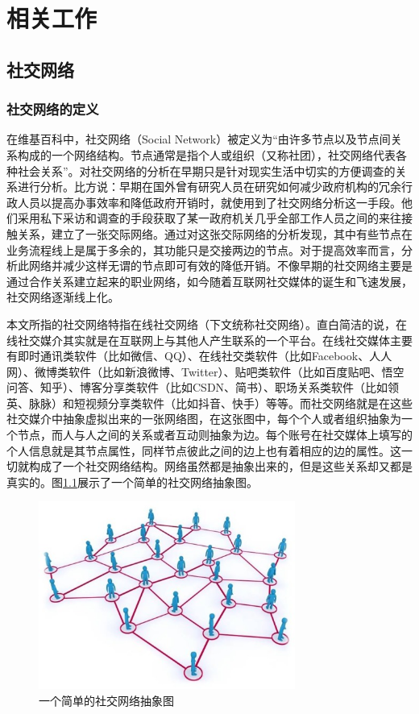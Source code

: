 \chapter{相关工作}
\section{社交网络}
\subsection{社交网络的定义}
在维基百科中，社交网络（Social Network）被定义为“由许多节点以及节点间关系构成的一个网络结构。节点通常是指个人或组织（又称社团），社交网络代表各种社会关系”。对社交网络的分析在早期只是针对现实生活中切实的方便调查的关系进行分析。比方说：早期在国外曾有研究人员在研究如何减少政府机构的冗余行政人员以提高办事效率和降低政府开销时，就使用到了社交网络分析这一手段。他们采用私下采访和调查的手段获取了某一政府机关几乎全部工作人员之间的来往接触关系，建立了一张交际网络。通过对这张交际网络的分析发现，其中有些节点在业务流程线上是属于多余的，其功能只是交接两边的节点。对于提高效率而言，分析此网络并减少这样无谓的节点即可有效的降低开销。不像早期的社交网络主要是通过合作关系建立起来的职业网络，如今随着互联网社交媒体的诞生和飞速发展，社交网络逐渐线上化。

本文所指的社交网络特指在线社交网络（下文统称社交网络）。直白简洁的说，在线社交媒介其实就是在互联网上与其他人产生联系的一个平台。在线社交媒体主要有即时通讯类软件（比如微信、QQ）、在线社交类软件（比如Facebook、人人网）、微博类软件（比如新浪微博、Twitter）、贴吧类软件（比如百度贴吧、悟空问答、知乎）、博客分享类软件（比如CSDN、简书）、职场关系类软件（比如领英、脉脉）和短视频分享类软件（比如抖音、快手）等等。而社交网络就是在这些社交媒介中抽象虚拟出来的一张网络图，在这张图中，每个个人或者组织抽象为一个节点，而人与人之间的关系或者互动则抽象为边。每个账号在社交媒体上填写的个人信息就是其节点属性，同样节点彼此之间的边上也有着相应的边的属性。这一切就构成了一个社交网络结构。网络虽然都是抽象出来的，但是这些关系却又都是真实的。图\ref{fig:fig2-0}展示了一个简单的社交网络抽象图。

\begin{figure}
  \centering
  \includegraphics[width=0.75\textwidth]{figures/fig2-0}
  \caption{一个简单的社交网络抽象图}\label{fig:fig2-0}
\end{figure}


